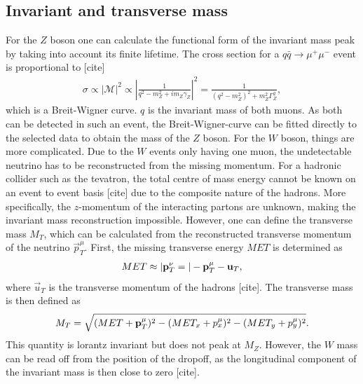 \documentclass[twoside,        %
               BCOR12mm,       %
               ngerman,english, %
               fleqn,headsepline=false,footsepline=false
              ]{Vorlage/MFPREPORT}
\begin{document}
\subsection{Invariant and transverse mass}
For the $Z$ boson one can calculate the functional form of the invariant mass
peak by taking into account its finite lifetime.
The cross section for a $q\bar q\rightarrow \mu^+\mu^-$ event is proportional
to [cite]
\begin{align}
    \sigma\propto|\mathcal{M}|^2\propto\left|\frac{1}{q^2-m_Z^2+im_Z\gamma_Z}\right|^2=\frac{1}{(q^2-m_Z^2)^2+m_Z^2\Gamma_Z^2},
    \label{eq:breit}
\end{align}which is a Breit-Wigner curve.
$q$ is the invariant mass of both muons. As both can be detected in such an
event, the Breit-Wigner-curve can be fitted directly to the selected data to
obtain the mass of the $Z$ boson.
For the $W$ boson, things are more complicated. Due to the $W$ events only
having one muon, the undetectable neutrino has to be reconstructed from the
missing momentum. For a hadronic collider such as the tevatron, the total
centre of mass energy cannot be known on an event to event basis [cite] due to
the composite nature of the hadrons. More specifically, the $z$-momentum of the
interacting partons are unknown, making the invariant mass reconstruction
impossible. However, one can define the transverse mass $M_T$, which can be
calculated from the reconstructed transverse momentum of the neutrino
$\vec{p}_T^\mu$. First, the missing transverse energy $MET$ is determined as
\begin{align}
    MET\approx|\bold{p}_T^\nu=|-\bold{p}_T^\mu-\bold{u}_T,
    \label{eq:met}
\end{align}where $\vec{u}_T$ is the transverse momentum of the hadrons [cite].
The transverse mass is then defined as
\begin{align}
    M_T=\sqrt{(MET+\bold{p}_T^\mu)^2-(MET_x+p_x^\mu)^2-(MET_y+p_y^\mu)^2}.
    \label{eq:mt}
\end{align}
This quantity is lorantz invariant but does not peak at $M_Z$. However, the $W$
mass can be read off from the position of the dropoff, as the longitudinal
component of the invariant mass is then close to zero [cite].
\end{document}
